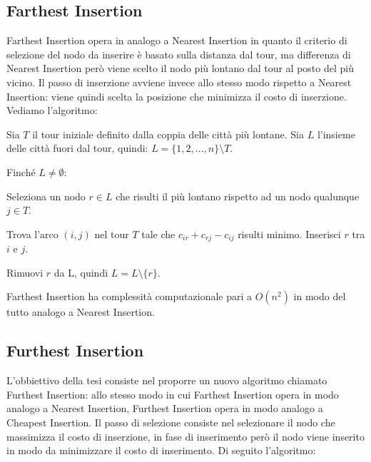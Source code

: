 \documentclass[a4paper,12pt]{report}
\begin{document}
\subsection{Farthest Insertion}
Farthest Insertion opera in analogo a Nearest Insertion in quanto il criterio di selezione del nodo da inserire è basato sulla distanza dal tour, ma differenza di Nearest Insertion però viene scelto il nodo più lontano dal tour al posto del più vicino. Il passo di inserzione avviene invece allo stesso modo rispetto a Nearest Insertion: viene quindi scelta la posizione che minimizza il costo di inserzione. Vediamo l'algoritmo:

\begin{legal}
  \item Sia $T$ il tour iniziale definito dalla coppia delle città più lontane. Sia $L$ l'insieme delle città fuori dal tour, quindi: $L = \{1, 2, ..., n\} \setminus T$.
  \item Finché $L \neq \emptyset$:
  \begin{legal}
    \item Seleziona un nodo $r \in L$ che risulti il più lontano rispetto ad un nodo qualunque $j \in T$.
    \item Trova l'arco $(i, j)$ nel tour $T$ tale che $c_{ir} + c_{rj} - c_{ij}$ risulti minimo. Inserisci $r$ tra $i$ e $j$.  
    \item Rimuovi $r$ da L, quindi $L = L \setminus \{r\}$.
  \end{legal}
\end{legal}
\hfill \break Farthest Insertion ha complessità computazionale pari a $O(n^2)$ in modo del tutto analogo a Nearest Insertion.

\subsection{Furthest Insertion}
L'obbiettivo della tesi consiste nel proporre un nuovo algoritmo chiamato Furthest Insertion: allo stesso modo in cui Farthest Insertion opera in modo analogo a Nearest Insertion, Furthest Insertion opera in modo analogo a Cheapest Insertion. Il passo di selezione consiste nel selezionare il nodo che massimizza il costo di inserzione, in fase di inserimento però il nodo viene inserito in modo da minimizzare il costo di inserimento. Di seguito l'algoritmo:
\end{document}
